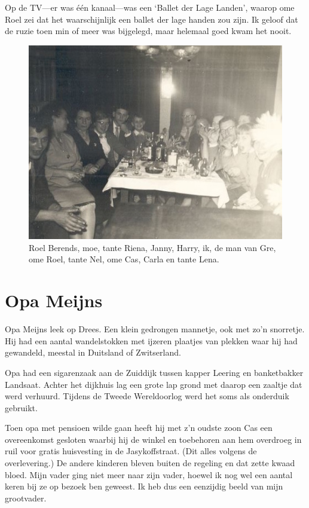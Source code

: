 \documentclass[12pt,twoside, openright]{memoir}
\begin{document}
Op de TV---er was één kanaal---was een `Ballet der Lage Landen', waarop ome Roel zei dat het waarschijnlijk een ballet der lage handen zou zijn. Ik geloof dat de ruzie toen min of meer was bijgelegd, maar helemaal goed kwam het nooit.  

\begin{figure}[t]
\includegraphics[width=\textwidth]{img/ch1/oudnieuw}
\caption*{\footnotesize Roel Berends, moe, tante Riena, Janny, Harry, ik, de man van Gre, ome Roel, tante Nel, ome Cas, Carla en tante Lena.}
\end{figure} 

\chapter{Opa Meijns} %
\label{cha:opa_meijns}

Opa Meijns leek op Drees. Een klein gedrongen mannetje, ook met zo’n snorretje. Hij had een aantal wandelstokken met ijzeren plaatjes van plekken waar hij had gewandeld, meestal in Duitsland of Zwitserland.

Opa had een sigarenzaak aan de Zuiddijk tussen kapper Leering en banketbakker Landsaat. Achter het dijkhuis lag een grote lap grond met daarop een zaaltje dat werd verhuurd. Tijdens de Tweede Wereldoorlog werd het soms als onderduik gebruikt. 

Toen opa met pensioen wilde gaan heeft hij met z’n oudste zoon Cas een overeenkomst gesloten waarbij hij de winkel en toebehoren aan hem overdroeg in ruil voor gratis huisvesting in de Jasykoffstraat. (Dit alles volgens de overlevering.) De andere kinderen bleven buiten de regeling en dat zette kwaad bloed. Mijn vader ging niet meer naar zijn vader, hoewel ik nog wel een aantal keren bij ze op bezoek ben geweest. Ik heb dus een eenzijdig beeld van mijn grootvader.
\end{document}
